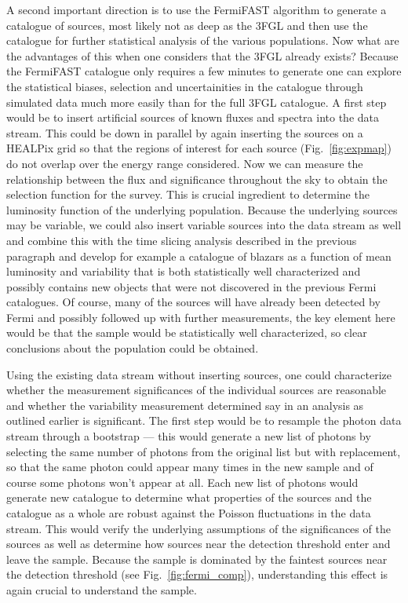 \documentclass[useAMS,usenatbib]{mn2e}
\begin{document}
A second important direction is to use the FermiFAST algorithm to
generate a catalogue of sources, most likely not as deep as the 3FGL
and then use the catalogue for further statistical analysis of the
various populations.  Now what are the advantages of this when one
considers that the 3FGL already exists?  Because the FermiFAST
catalogue only requires a few minutes to generate one can explore the
statistical biases, selection and uncertainities in the catalogue
through simulated data much more easily than for the full 3FGL
catalogue.  A first step would be to insert artificial sources of
known fluxes and spectra into the data stream.  This could be down in
parallel by again inserting the sources on a HEALPix grid so that the
regions of interest for each source (Fig.~\ref{fig:expmap}) do not
overlap over the energy range considered.  Now we can measure the
relationship between the flux and significance throughout the sky to
obtain the selection function for the survey.  This is crucial
ingredient to determine the luminosity function of the underlying
population.  Because the underlying sources may be variable, we could
also insert variable sources into the data stream as well and combine
this with the time slicing analysis described in the previous
paragraph and develop for example a catalogue of blazars as a function
of mean luminosity and variability that is both statistically well
characterized and possibly contains new objects that were not
discovered in the previous Fermi catalogues.  Of course, many of the sources
will have already been detected by Fermi and possibly followed up
with further measurements, the key element here would be that the sample
would be statistically well characterized, so clear conclusions about the
population could be obtained.

Using the existing data stream without inserting sources, one could
characterize whether the measurement significances of the individual
sources are reasonable and whether the variability measurement
determined say in an analysis as outlined earlier is significant.  The
first step would be to resample the photon data stream through a
bootstrap --- this would generate a new list of photons by selecting
the same number of photons from the original list but with
replacement, so that the same photon could appear many times in the
new sample and of course some photons won't appear at all.  Each new
list of photons would generate new catalogue to determine what
properties of the sources and the catalogue as a whole are robust
against the Poisson fluctuations in the data stream.  This would
verify the underlying assumptions of the significances of the sources
as well as determine how sources near the detection threshold enter
and leave the sample.  Because the sample is dominated by the faintest
sources near the detection threshold (see Fig.~\ref{fig:fermi_comp}),
understanding this effect is again crucial to understand the sample.
\end{document}

